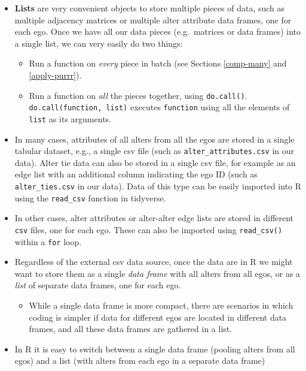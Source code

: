 \documentclass[
]{book}
\providecommand{\tightlist}{%
  \setlength{\itemsep}{0pt}\setlength{\parskip}{0pt}}
\begin{document}
\begin{itemize}
\tightlist
\item
  \textbf{Lists} are very convenient objects to store multiple pieces of data, such as multiple adjacency matrices or multiple alter attribute data frames, one for each ego. Once we have all our data pieces (e.g.~matrices or data frames) into a single list, we can very easily do two things:

  \begin{itemize}
  \tightlist
  \item
    Run a function on \emph{every} piece in batch (see Sections \ref{comp-many} and \ref{apply-purrr}).
  \item
    Run a function on \emph{all} the pieces together, using \texttt{do.call()}. \texttt{do.call(function,\ list)} executes \texttt{function} using all the elements of \texttt{list} as its arguments.
  \end{itemize}
\item
  In many cases, attributes of all alters from all the egos are stored in a single tabular dataset, e.g., a single csv file (such as \texttt{alter\_attributes.csv} in our data). Alter tie data can also be stored in a single csv file, for example as an edge list with an additional column indicating the ego ID (such as \texttt{alter\_ties.csv} in our data). Data of this type can be easily imported into R using the \texttt{read\_csv} function in tidyverse.
\item
  In other cases, alter attributes or alter-alter edge lists are stored in different \texttt{csv} files, one for each ego. These can also be imported using \texttt{read\_csv()} within a \texttt{for} loop.
\item
  Regardless of the external csv data source, once the data are in R we might want to store them as a single \emph{data frame} with all alters from all egos, or as a \emph{list} of separate data frames, one for each ego.

  \begin{itemize}
  \tightlist
  \item
    While a single data frame is more compact, there are scenarios in which coding is simpler if data for different egos are located in different data frames, and all these data frames are gathered in a list.
  \end{itemize}
\item
  In R it is easy to switch between a single data frame (pooling alters from all egos) and a list (with alters from each ego in a separate data frame)


\end{itemize}
\end{document}
